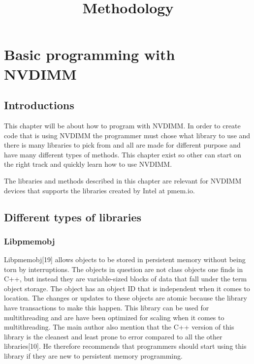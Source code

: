 \documentclass[12pt,a4paper,USenglish]{article}      %
\title{Methodology}  %
\begin{document}
\section{Basic programming with NVDIMM}
\subsection{Introductions}
This chapter will be about how to program with NVDIMM. In order to create code that is using NVDIMM the programmer must chose what library to use and there is many libraries to pick from and all are made for different purpose and have many different types of methods. This chapter exist so other can start on the right track and quickly learn how to use NVDIMM.

The libraries and methods described in this chapter are relevant for NVDIMM devices that supports the libraries created by Intel at pmem.io.

\subsection{Different types of libraries}
\subsubsection{Libpmemobj}
Libpmemobj[19] allows objects to be stored in persistent memory without being torn by interruptions. The objects in question are not class objects one finds in C++, but instead they are variable-sized blocks of data that fall under the term object storage. The object has an object ID that is independent when it comes to location. The changes or updates to these objects are atomic because the library have transactions to make this happen. This library can be used for multithreading and are have been optimized for scaling when it comes to multithreading. The main author also mention that the C++ version of this library is the cleanest and least prone to error compared to all the other libraries[10]. He therefore recommends that programmers should start using this library if they are new to persistent memory programming.
\end{document}
